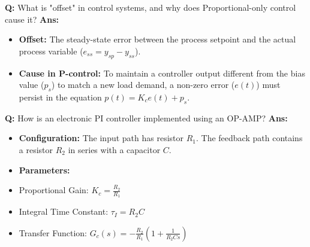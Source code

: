 \documentclass[10pt,a4paper,twocolumn]{article}
\begin{document}
\begin{tcolorbox}[
  colback=white,
  colframe=UnitColorTwo,
  colbacktitle=gray!10!white,
  coltitle=black,
  fonttitle=\bfseries\sffamily\small,
  title={Unit II $\bullet$ Card 5: Offset Definition},
  boxrule=1.2pt,
  arc=2mm,
  outer arc=2mm,
  boxsep=1.5mm,
  top=1mm,
  bottom=1mm,
  left=1.5mm,
  right=1.5mm,
  before skip=2.5mm,
  after skip=2.5mm
]
\textbf{Q:} What is "offset" in control systems, and why does Proportional-only control cause it?
\tcbline
\textbf{Ans:} \begin{itemize}
  \item   \textbf{Offset:} The steady-state error between the process setpoint and the actual process variable ($e_{ss} = y_{sp} - y_{ss}$).
  \item   \textbf{Cause in P-control:} To maintain a controller output different from the bias value ($p_s$) to match a new load demand, a non-zero error ($e(t)$) must persist in the equation $p(t) = K_c e(t) + p_s$.
\end{itemize}
\end{tcolorbox}


\begin{tcolorbox}[
  colback=white,
  colframe=UnitColorTwo,
  colbacktitle=gray!10!white,
  coltitle=black,
  fonttitle=\bfseries\sffamily\small,
  title={Unit II $\bullet$ Card 6: OP-AMP PI Controller Circuit},
  boxrule=1.2pt,
  arc=2mm,
  outer arc=2mm,
  boxsep=1.5mm,
  top=1mm,
  bottom=1mm,
  left=1.5mm,
  right=1.5mm,
  before skip=2.5mm,
  after skip=2.5mm
]
\textbf{Q:} How is an electronic PI controller implemented using an OP-AMP?
\tcbline
\textbf{Ans:} \begin{itemize}
  \item   \textbf{Configuration:} The input path has resistor $R_1$. The feedback path contains a resistor $R_2$ in series with a capacitor $C$.
  \item   \textbf{Parameters:}
  \item   Proportional Gain: $K_c = \frac{R_2}{R_1}$
  \item   Integral Time Constant: $\tau_I = R_2 C$
  \item   Transfer Function: $G_c(s) = -\frac{R_2}{R_1} \left(1 + \frac{1}{R_2 C s}\right)$
\end{itemize}
\end{tcolorbox}
\end{document}

